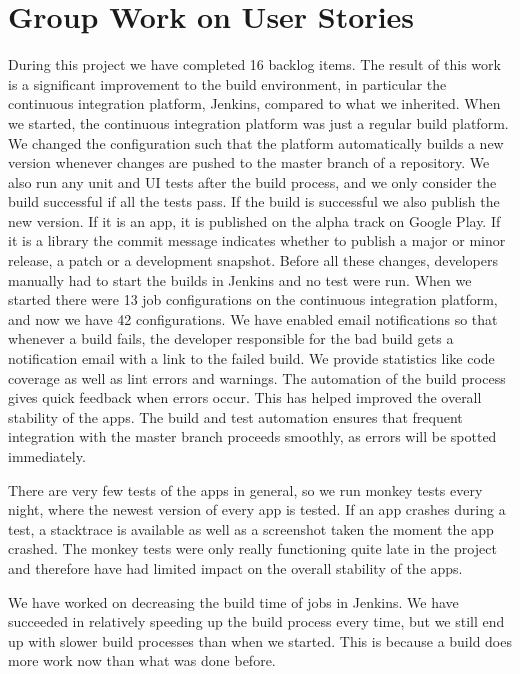 \section{Group Work on User Stories}\label{conc:userstories}
During this project we have completed 16 backlog items. The result of this work is a significant improvement to the build environment, in particular the continuous integration platform, Jenkins, compared to what we inherited. When we started, the continuous integration platform was just a regular build platform. We changed the configuration such that the platform automatically builds a new version whenever changes are pushed to the master branch of a repository. We also run any unit and UI tests after the build process, and we only consider the build successful if all the tests pass. If the build is successful we also publish the new version. If it is an app, it is published on the alpha track on Google Play. If it is a library the commit message indicates whether to publish a major or minor release, a patch or a development snapshot. Before all these changes, developers manually had to start the builds in Jenkins and no test were run. When we started there were 13 job configurations on the continuous integration platform, and now we have 42 configurations. We have enabled email notifications so that whenever a build fails, the developer responsible for the bad build gets a notification email with a link to the failed build. We provide statistics like code coverage as well as lint errors and warnings. The automation of the build process gives quick feedback when errors occur. This has helped improved the overall stability of the apps. The build and test automation ensures that frequent integration with the master branch proceeds smoothly, as errors will be spotted immediately.

There are very few tests of the apps in general, so we run monkey tests every night, where the newest version of every app is tested. If an app crashes during a test, a stacktrace is available as well as a screenshot taken the moment the app crashed. The monkey tests were only really functioning quite late in the project and therefore have had limited impact on the overall stability of the apps.

We have worked on decreasing the build time of jobs in Jenkins. We have succeeded in relatively speeding up the build process every time, but we still end up with slower build processes than when we started. This is because a build does more work now than what was done before.

